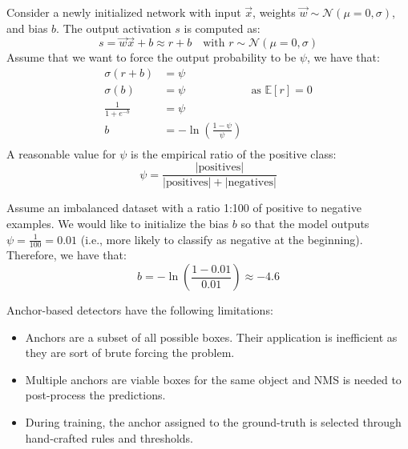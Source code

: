 \begin{description}
\begin{description}
                Consider a newly initialized network with input $\vec{x}$, weights $\vec{w} \sim \mathcal{N}(\mu=0, \sigma)$, and bias $b$. The output activation $s$ is computed as:
                \[ s = \vec{w}\vec{x} + b \approx r + b \quad \text{with } r \sim \mathcal{N}(\mu=0, \sigma) \] 
                Assume that we want to force the output probability to be $\psi$, we have that:
                \[ 
                    \begin{aligned}
                        \sigma(r + b) &= \psi \\
                        \sigma(b) &= \psi & \text{as $\mathbb{E}[r] = 0$} \\
                        \frac{1}{1+e^{-b}} &= \psi \\
                        b &= -\ln\left( \frac{1-\psi}{\psi} \right) \\
                    \end{aligned}
                \]
                A reasonable value for $\psi$ is the empirical ratio of the positive class: 
                \[
                    \psi = \frac{|\text{positives}|}{|\text{positives}| + |\text{negatives}|}
                \]

                \begin{example}
                    Assume an imbalanced dataset with a ratio 1:100 of positive to negative examples. We would like to initialize the bias $b$ so that the model outputs $\psi = \frac{1}{100} = 0.01$ (i.e., more likely to classify as negative at the beginning). Therefore, we have that:
                    \[ b = -\ln\left( \frac{1 - 0.01}{0.01} \right) \approx -4.6 \]
                \end{example}
        \end{description}
\end{description}

\begin{remark}
    Anchor-based detectors have the following limitations:
    \begin{itemize}
        \item Anchors are a subset of all possible boxes. Their application is inefficient as they are sort of brute forcing the problem.
        \item Multiple anchors are viable boxes for the same object and NMS is needed to post-process the predictions.
        \item During training, the anchor assigned to the ground-truth is selected through hand-crafted rules and thresholds.
    \end{itemize}
\end{remark}


